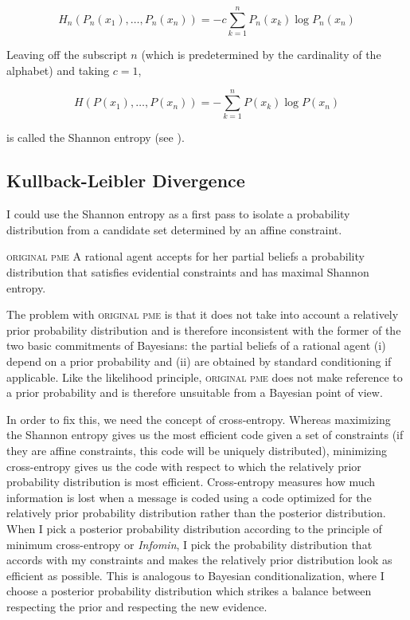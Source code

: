 \documentclass[phd,12pt,oneside]{ubcthesis}
\begin{document}
\begin{equation}
  \label{eq:kualiaku}
  H_{n}(P_{n}(x_{1}),\ldots,P_{n}(x_{n}))=-c\sum_{k=1}^{n}P_{n}(x_{k})\log{}P_{n}(x_{n})
\end{equation}

{\noindent}Leaving off the subscript $n$ (which is predetermined by the
cardinality of the alphabet) and taking $c=1$, 

\begin{equation}
  \label{eq:oowoongu}
  H(P(x_{1}),\ldots,P(x_{n}))=-\sum_{k=1}^{n}P(x_{k})\log{}P(x_{n})
\end{equation}

{\noindent}is called the Shannon entropy (see ).

\subsection{Kullback-Leibler Divergence}
\label{subsec:sihaivei}

I could use the Shannon entropy as a first pass to isolate a
probability distribution from a candidate set determined by an affine
constraint.

\begin{quotex}
  \textsc{original pme} A rational agent accepts for her partial
  beliefs a probability distribution that satisfies evidential
  constraints and has maximal Shannon entropy.
\end{quotex}

{\noindent}The problem with \textsc{original pme} is that it does not
take into account a relatively prior probability distribution and is
therefore inconsistent with the former of the two basic commitments of
Bayesians: the partial beliefs of a rational agent (i) depend on a
prior probability and (ii) are obtained by standard conditioning if
applicable. Like the likelihood principle, \textsc{original pme} does
not make reference to a prior probability and is therefore unsuitable
from a Bayesian point of view.

In order to fix this, we need the concept of cross-entropy. Whereas
maximizing the Shannon entropy gives us the most efficient code given
a set of constraints (if they are affine constraints, this code will
be uniquely distributed), minimizing cross-entropy gives us the code
with respect to which the relatively prior probability distribution is
most efficient. Cross-entropy measures how much information is lost
when a message is coded using a code optimized for the relatively
prior probability distribution rather than the  posterior
distribution. When I pick a posterior probability distribution
according to the principle of minimum cross-entropy or \emph{Infomin},
I pick the probability distribution that accords with my constraints
and makes the relatively prior distribution look as efficient as
possible. This is analogous to Bayesian conditionalization, where I
choose a posterior probability distribution which strikes a balance
between respecting the prior and respecting the new evidence.
\end{document}
